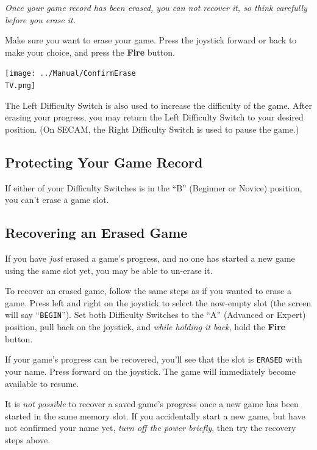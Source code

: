 \documentclass[10pt,twocolumn,openany,article]{memoir}
\newcommand\TV{NTSC} %
\begin{document}
\ifdefined\DEMO

\emph{Once your game record has been  erased, you can not recover it, so
  think carefully before you erase it.}

\else

Make sure  you want to  erase your game.  Press the joystick  forward or
back to make your choice, and press the \textbf{Fire} button.

\begin{center}
  \texttt{[image: ../Manual/ConfirmErase\\TV.png]}
\end{center}

\fi

The Left  Difficulty Switch is also  used to increase the  difficulty of
the  game.  After  erasing  your  progress,  you  may  return  the  Left
Difficulty  Switch  to  your  desired position.  (On  SECAM,  the  Right
Difficulty Switch is used to pause the game.)

\subsection{Protecting Your Game Record}

If  either of  your Difficulty  Switches is  in the  ``B'' (Beginner  or
Novice) position, you can't erase a game slot.

\ifdefined\DEMO\else

\subsection{Recovering an Erased Game}

If you have \emph{just} erased a game's progress, and no one has started
a new game using the same slot yet, you may be able to un-erase it.

To recover  an erased game,  follow the same steps  as if you  wanted to
erase  a game.  Press  left and  right  on the  joystick  to select  the
now-empty  slot  (the  screen  will say  ``\texttt{BEGIN}'').  Set  both
Difficulty Switches  to the  ``A'' (Advanced  or Expert)  position, pull
back  on  the joystick,  and  \emph{while  holding  it back},  hold  the
\textbf{Fire} button.

If your  game's progress can be  recovered, you'll see that  the slot is
\texttt{ERASED} with your name. Press  forward on the joystick. The game
will immediately become available to resume.

It is \emph{not possible} to recover  a saved game's progress once a new
game has been started in the same memory slot. If you accidentally start
a new  game, but have  not confirmed your  name yet, \emph{turn  off the
  power briefly}, then try the recovery steps above.
\end{document}
